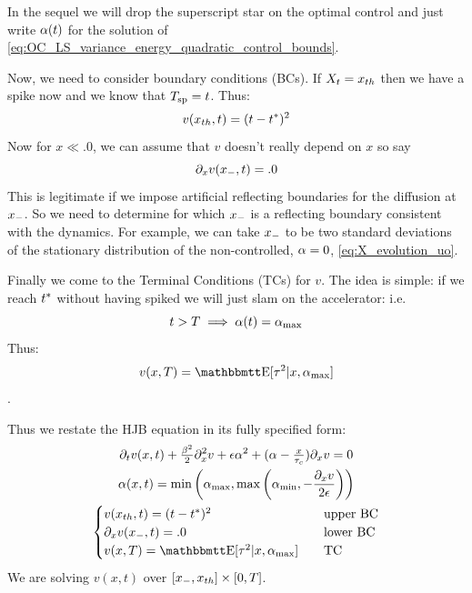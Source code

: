 \documentclass{article}
\begin{document}
In the sequel we will drop the superscript star on the optimal control and
just write ${\alpha}(t)$ for the solution of
\cref{eq:OC_LS_variance_energy_quadratic_control_bounds}. 

Now, we need to consider boundary conditions (BCs). If $X_t =
{ x_{th} }$ then we have a spike now and we know that ${ T_{\textrm{sp} } } = t$. Thus:
$$
v({ x_{th} },t) = (t-{ t^* })^2
$$
Now for $x \ll .0$, we can assume that $v$ doesn't really depend on $x$ so say 
$$
{\partial}_x v({ x_{-} }, t) = .0
$$
This is legitimate if we impose artificial reflecting boundaries for the
diffusion at ${ x_{-} }$. So we need to determine for which ${ x_{-} }$ is a reflecting
boundary consistent with the dynamics. For example, we can take ${ x_{-} }$ to be
two standard deviations of the stationary distribution of the non-controlled, ${\alpha}=0$, \cref{eq:X_evolution_uo}.

Finally we come to the Terminal Conditions (TCs) for $v$. The idea is simple: if
we reach ${ t^* }$ without having spiked we will just slam on the accelerator: i.e.\
$$t>T \implies {\alpha}(t) = { {\alpha}_{\textrm{max}} }$$ Thus: $$ v(x,T) = \Exp[\t^2|x, \amax] $$.  

Thus we restate the HJB equation in its fully specified form:
\begin{equation}
\begin{gathered}
\di_t v(x,t) + \tfrac{\b^2}{2} \di_x^2 v + 
\e \a^2 + (\a -\tfrac{x}{\tc}) \di_x v 
= 0
\\
\a (x,t) = \min \left(\amax, \max\left(\amin, -\frac{\di_x v}{2\e}\right)
\right)
\\
\begin{cases}
v(\xth,t) = (t-\T)^2  \quad & \textrm{upper BC}
\\
\di_x v(\xmin, t)  = .0  \quad &\textrm{lower BC}
\\
v(x,T)  = \Exp[\t^2|x, \amax]  \quad& \textrm{TC}
\end{cases}
\end{gathered}
\label{eq:OC_LS_HJB_full}
\end{equation} 
We are solving $v(x,t)$ over $[{ x_{-} }, { x_{th} }] \times [0,T]$.
\end{document}

